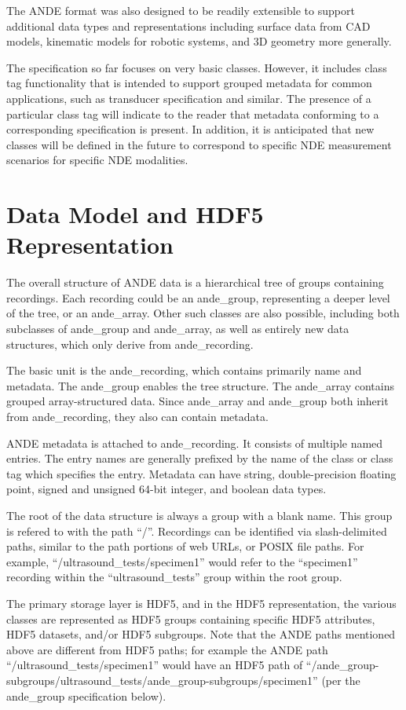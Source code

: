 \documentclass{article}
\begin{document}
The ANDE format was also designed to be readily extensible to support additional data types and representations including surface data from CAD models, kinematic models for robotic systems, and 3D geometry more generally.

The specification so far focuses on very basic classes. However, it includes class tag functionality that is intended to support grouped metadata for common applications, such as transducer specification and similar. The presence of a particular class tag will indicate to the reader that metadata conforming to a corresponding specification is present. In addition, it is anticipated that new classes will be defined in the future to correspond to specific NDE measurement scenarios for specific NDE modalities.

\section{Data Model and HDF5 Representation}

The overall structure of ANDE data is a hierarchical tree of groups containing
recordings. Each recording could be an ande\_group, representing a deeper level of the tree, or an ande\_array. Other such classes are also possible, including both subclasses of ande\_group and ande\_array, as well as entirely new data structures, which only derive from ande\_recording.

The basic unit is the ande\_recording, which contains primarily name and metadata. The ande\_group enables the tree structure. The ande\_array contains grouped array-structured data. Since ande\_array and ande\_group both inherit from ande\_recording, they also can contain metadata.

ANDE metadata is attached to ande\_recording. It consists of multiple named entries. The entry names are generally prefixed by the name of the class or class tag which specifies the entry. Metadata can have string, double-precision floating point, signed and unsigned 64-bit integer, and boolean data types.

The root of the data structure is always a group with a blank name. This group is refered to with the path ``/''. Recordings can be identified via slash-delimited paths, similar to the path portions of web URLs, or POSIX file paths. For example, ``/ultrasound\_tests/specimen1'' would refer to the ``specimen1'' recording within the ``ultrasound\_tests'' group within the root group.

The primary storage layer is HDF5, and in the HDF5 representation, the various classes are represented as HDF5 groups containing specific HDF5 attributes, HDF5 datasets, and/or HDF5 subgroups. Note that the ANDE paths mentioned above are different from HDF5 paths; for example the ANDE path ``/ultrasound\_tests/specimen1'' would have an HDF5 path of ``/ande\_group-subgroups/ultrasound\_tests/ande\_group-subgroups/specimen1'' (per the ande\_group specification below).
\end{document}
